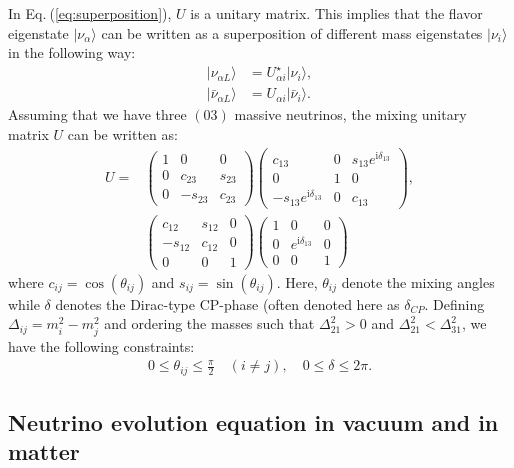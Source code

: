 \documentclass[twocolumn,secnumarabic,amssymb, nobibnotes, aps, prd,10pt]{revtex4-1}
\newcommand{\kt}[1]{\vert #1 \rangle}
\newcommand{\Eq}[1]{Eq.$\:$(\ref{#1})}
\begin{document}
In \Eq{eq:superposition}, $U$ is a unitary matrix. This implies that the flavor eigenstate
$\kt{\nu_\alpha}$ can be written as a superposition of different mass eigenstates $\kt{\nu_i}$
in the following way:
\begin{align}
\kt{\nu_{\alpha L}} &= U^\star_{\alpha i} \kt{\nu_i}, \\
\kt{\bar{\nu}_{\alpha L}} &= U_{\alpha i} \kt{\bar{\nu}_i}.
\end{align}
Assuming that we have three $(03)$ massive neutrinos, the mixing unitary matrix $U$ can 
be written as:
\begin{align}
U = & \left(\begin{array}{ccc}
1 & 0 & 0 \\
0 & c_{23} & s_{23} \\
0 & -s_{23} & c_{23}
\end{array}\right)\left(\begin{array}{ccc}
c_{13} & 0 & s_{13} e^{\mathrm{i} \delta_{13}} \\
0 & 1 & 0 \\
-s_{13} e^{\mathrm{i} \delta_{13}} & 0 & c_{13}
\end{array}\right) , \nonumber \\
& \left(\begin{array}{ccc}
c_{12} & s_{12} & 0 \\
-s_{12} & c_{12} & 0 \\
0 & 0 & 1
\end{array}\right)\left(\begin{array}{ccc}
1 & 0 & 0 \\
0 & e^{ \mathrm{i} \delta_{13} } & 0 \\
0 & 0 & 1
\end{array}\right)
\label{eq:evolution_matrix}
\end{align}
where $c_{ij} = \cos(\theta_{ij})$ and $s_{ij} = \sin(\theta_{ij})$. Here, $\theta_{ij}$
denote the mixing angles while $\delta$ denotes the Dirac-type CP-phase (often denoted 
here as $\delta_{CP}$. Defining $\Delta_{ij} = m_i^2 - m_j^2$ and ordering the masses 
such that $\Delta_{21}^2 > 0$ and $\Delta_{21}^2 < \Delta_{31}^2$, we have the following 
constraints:
\begin{align}
0 \leq \theta_{ij} \leq \frac{\pi}{2} \quad (i \neq j), \quad 0 \leq \delta \leq 2 \pi .
\end{align}


\subsection{Neutrino evolution equation in vacuum and in matter}
\label{subsec:evoleq}
\end{document}
